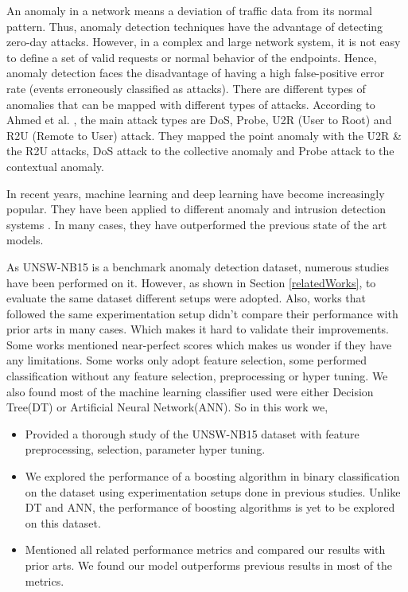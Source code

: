 \documentclass[14pt, conference]{IEEEtran}
\begin{document}
An anomaly in a network means a deviation of traffic data from its normal pattern. Thus, anomaly detection techniques have the advantage of detecting zero-day attacks. However, in a complex and large network system,  it is not easy to define a set of valid requests or normal behavior of the endpoints. Hence, anomaly detection faces the disadvantage of having a high false-positive error rate (events erroneously classified as attacks). There are different types of anomalies that can be mapped with different types of attacks. According to Ahmed et al. \cite{ahmed2016survey}, the main attack types are DoS, Probe, U2R (User to Root) and R2U (Remote to User) attack. They mapped the point anomaly with the U2R \& the R2U attacks, DoS attack to the collective anomaly and Probe attack to the contextual anomaly. 

In recent years, machine learning and deep learning have become increasingly popular. They have been applied to different anomaly and intrusion detection systems \cite{naseer2018enhanced} \cite{fernandes2019comprehensive} \cite{chalapathy2019deep}. In many cases, they have outperformed the previous state of the art models. 

As UNSW-NB15\cite{moustafa2015unsw} is a benchmark anomaly detection dataset, numerous studies have been performed on it. However, as shown in Section \ref{relatedWorks}, to evaluate the same dataset different setups were adopted. Also, works that followed the same experimentation setup didn't compare their performance with prior arts in many cases. Which makes it hard to validate their improvements. Some works mentioned near-perfect scores which makes us wonder if they have any limitations. Some works only adopt feature selection, some performed classification without any feature selection, preprocessing or hyper tuning. We also found most of the machine learning classifier used were either Decision Tree(DT) or Artificial Neural Network(ANN). So in this work we,

\begin{itemize}
    \item Provided a thorough study of the UNSW-NB15 dataset with feature preprocessing, selection, parameter hyper tuning. 
    \item We explored the performance of a boosting algorithm in binary classification on the dataset using experimentation setups done in previous studies. Unlike DT and ANN, the performance of boosting algorithms is yet to be explored on this dataset.
    \item Mentioned all related performance metrics and compared our results with prior arts. We found our model outperforms previous results in most of the metrics.
\end{itemize}
\end{document}
